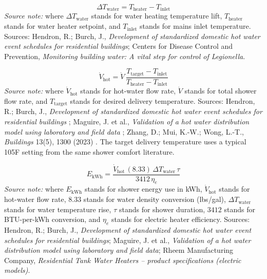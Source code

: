 \documentclass[12pt]{article}
\begin{document}
\begin{equation}
\label{eq:shower_delta_t}
\Delta T_{\mathrm{water}} = T_{\mathrm{heater}}-T_{\mathrm{inlet}}
\end{equation}
\noindent\textit{Source note:} where $\Delta T_{\mathrm{water}}$ stands for water heating temperature lift, $T_{\mathrm{heater}}$ stands for water heater setpoint, and $T_{\mathrm{inlet}}$ stands for mains inlet temperature. Sources: Hendron, R.; Burch, J., \emph{Development of standardized domestic hot water event schedules for residential buildings}; Centers for Disease Control and Prevention, \emph{Monitoring building water: A vital step for control of Legionella}.

\begin{equation}
\label{eq:shower_effective_gpm}
\dot V_{\mathrm{hot}} = \dot V\,\frac{T_{\mathrm{target}}-T_{\mathrm{inlet}}}{T_{\mathrm{heater}}-T_{\mathrm{inlet}}}
\end{equation}
\noindent\textit{Source note:} where $\dot V_{\mathrm{hot}}$ stands for hot-water flow rate, $\dot V$ stands for total shower flow rate, and $T_{\mathrm{target}}$ stands for desired delivery temperature. Sources: Hendron, R.; Burch, J., \emph{Development of standardized domestic hot water event schedules for residential buildings} \cite{hendron2008}; Maguire, J. et al., \emph{Validation of a hot water distribution model using laboratory and field data} \cite{maguire2013}; Zhang, D.; Mui, K.-W.; Wong, L.-T., \emph{Buildings} 13(5), 1300 (2023) \cite{zhang2023}. The target delivery temperature uses a typical 105F setting from the same shower comfort literature.

\begin{equation}
\label{eq:shower_energy_kwh}
E_{\mathrm{kWh}} = \frac{\dot V_{\mathrm{hot}}\,(8.33)\,\Delta T_{\mathrm{water}}\,\tau}{3412\,\eta_e}
\end{equation}
\noindent\textit{Source note:} where $E_{\mathrm{kWh}}$ stands for shower energy use in kWh, $\dot V_{\mathrm{hot}}$ stands for hot-water flow rate, $8.33$ stands for water density conversion (lbs/gal), $\Delta T_{\mathrm{water}}$ stands for water temperature rise, $\tau$ stands for shower duration, $3412$ stands for BTU-per-kWh conversion, and $\eta_e$ stands for electric heater efficiency. Sources: Hendron, R.; Burch, J., \emph{Development of standardized domestic hot water event schedules for residential buildings}; Maguire, J. et al., \emph{Validation of a hot water distribution model using laboratory and field data}; Rheem Manufacturing Company, \emph{Residential Tank Water Heaters -- product specifications (electric models)}.
\end{document}

